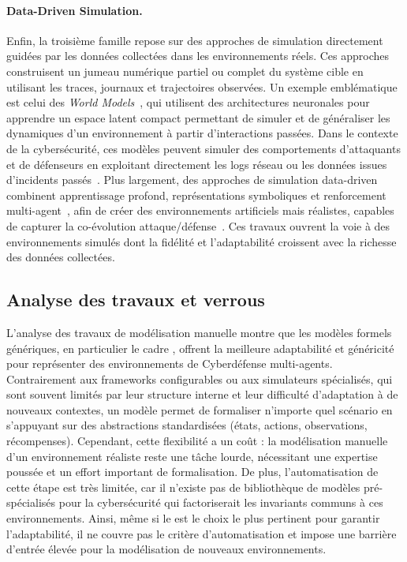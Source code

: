 \paragraph{Data-Driven Simulation.}
Enfin, la troisième famille repose sur des approches de simulation directement guidées par les données collectées dans les environnements réels. Ces approches construisent un jumeau numérique partiel ou complet du système cible en utilisant les traces, journaux et trajectoires observées. Un exemple emblématique est celui des \textit{World Models}~\cite{Ha2018}, qui utilisent des architectures neuronales pour apprendre un espace latent compact permettant de simuler et de généraliser les dynamiques d'un environnement à partir d'interactions passées. Dans le contexte de la cybersécurité, ces modèles peuvent simuler des comportements d'attaquants et de défenseurs en exploitant directement les logs réseau ou les données issues d'incidents passés~\cite{D2mbiT0vgP4J}. Plus largement, des approches de simulation data-driven combinent apprentissage profond, représentations symboliques et renforcement multi-agent~\cite{5oUSbVbTXX0J, RQyw5NYMj-wJ}, afin de créer des environnements artificiels mais réalistes, capables de capturer la co-évolution attaque/défense~\cite{oOfK6FXUSCAJ}. Ces travaux ouvrent la voie à des environnements simulés dont la fidélité et l'adaptabilité croissent avec la richesse des données collectées.

\subsection*{Analyse des travaux et verrous}

L'analyse des travaux de modélisation manuelle montre que les modèles formels génériques, en particulier le cadre , offrent la meilleure adaptabilité et généricité pour représenter des environnements de Cyberdéfense multi-agents. Contrairement aux frameworks configurables ou aux simulateurs spécialisés, qui sont souvent limités par leur structure interne et leur difficulté d'adaptation à de nouveaux contextes, un modèle  permet de formaliser n'importe quel scénario en s'appuyant sur des abstractions standardisées (états, actions, observations, récompenses). Cependant, cette flexibilité a un coût : la modélisation manuelle d'un environnement réaliste reste une tâche lourde, nécessitant une expertise poussée et un effort important de formalisation. De plus, l'automatisation de cette étape est très limitée, car il n'existe pas de bibliothèque de modèles  pré-spécialisés pour la cybersécurité qui factoriserait les invariants communs à ces environnements. Ainsi, même si le  est le choix le plus pertinent pour garantir l'adaptabilité, il ne couvre pas le critère d'automatisation et impose une barrière d'entrée élevée pour la modélisation de nouveaux environnements.

